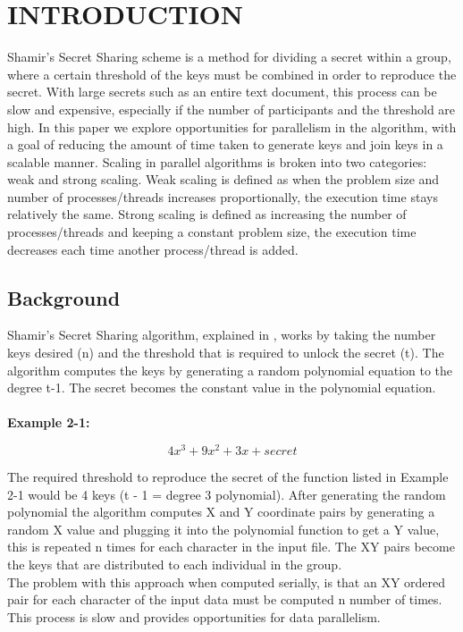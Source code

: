 \documentclass[main.tex]{subfiles}
\begin{document}
\section{INTRODUCTION} \label{sec2}

\indent Shamir's Secret Sharing scheme is a method for dividing a secret within a group, where a certain threshold of the keys must be combined in order to reproduce the secret.  With large secrets such as an entire text document, this process can be slow and expensive, especially if the number of participants and the threshold are high. In this paper we explore opportunities for parallelism in the algorithm, with a goal of reducing the amount of time taken to generate keys and join keys in a scalable manner. Scaling in parallel algorithms is broken into two categories: weak and strong scaling. Weak scaling is defined as when the problem size and number of processes/threads increases proportionally, the execution time stays relatively the same. Strong scaling is defined as increasing the number of processes/threads and keeping a constant problem size, the execution time decreases each time another process/thread is added.

\subsection{Background}
\indent Shamir's Secret Sharing algorithm, explained in \cite{three}, works by taking the number keys desired (n) and the threshold that is required to unlock the secret (t).  The algorithm computes the keys by generating a random polynomial equation to the degree t-1.  The secret becomes the constant value in the polynomial equation.\\ \\
\textbf{Example 2-1:}

\[ 4x^3 +  9x^2 + 3x + secret\]

\indent The required threshold to reproduce the secret of the function listed in Example 2-1 would be 4 keys (t - 1 = degree 3 polynomial). After generating the random polynomial the algorithm computes X and Y coordinate pairs by generating a random X value and plugging it into the polynomial function to get a Y value, this is repeated n times for each character in the input file.  The XY pairs become the keys that are distributed to each individual in the group. \\
\indent The problem with this approach when computed serially, is that an XY ordered pair for each character of the input data must be computed n number of times. This process is slow and provides opportunities for data parallelism.
\end{document}

